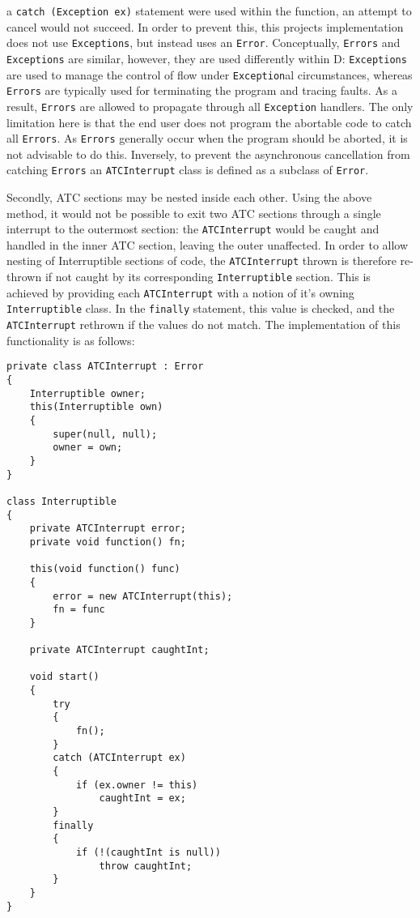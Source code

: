 a \texttt{catch (Exception ex)} statement were used within the function, an
attempt to cancel would not succeed. 
In order to prevent this, this projects implementation does not use 
\texttt{Exceptions}, but instead uses an \texttt{Error}. 
Conceptually, \texttt{Errors} and \texttt{Exceptions} are
similar, however, they are used differently within D: \texttt{Exceptions} are used to
manage the control of flow under \texttt{Exception}al circumstances, whereas
\texttt{Errors} are typically used for terminating the program and tracing faults. 
As a result, \texttt{Errors} are allowed to propagate through all 
\texttt{Exception} handlers. The only
limitation here is that the end user does not program the
abortable code to catch all \texttt{Errors}. As \texttt{Errors} generally occur 
when the program should be aborted, it is not advisable to do this. 
Inversely, to prevent the asynchronous cancellation from catching
\texttt{Errors} an \texttt{ATCInterrupt} class is defined as a subclass of
\texttt{Error}. 
\par\bigskip\noindent
Secondly, ATC sections may be nested inside each other. Using the above 
method, it would not be possible to exit two ATC sections through a single interrupt
to the outermost section: the \texttt{ATCInterrupt} would be caught and
handled in the inner ATC section, leaving the outer unaffected.
In order to allow nesting of Interruptible sections of code, the
\texttt{ATCInterrupt} thrown is therefore re-thrown if not caught by its 
corresponding \texttt{Interruptible} section. 
This is achieved by providing each \texttt{ATCInterrupt} with a notion of it's
owning \texttt{Interruptible} class. In the \texttt{finally} statement, this
value is checked, and the \texttt{ATCInterrupt} rethrown if the values do not
match. The implementation of this functionality is as follows: 
\begin{lstlisting}[basicstyle=\small]
private class ATCInterrupt : Error
{
    Interruptible owner;
    this(Interruptible own)
    {
        super(null, null);
        owner = own;
    }
}

class Interruptible
{
    private ATCInterrupt error; 
    private void function() fn; 

    this(void function() func)
    {
        error = new ATCInterrupt(this); 
        fn = func
    }

    private ATCInterrupt caughtInt;

    void start()
    {
        try
        {
            fn();
        }
        catch (ATCInterrupt ex)
        {
            if (ex.owner != this)
                caughtInt = ex;
        }
        finally
        {
            if (!(caughtInt is null))
                throw caughtInt;
        }
    }
}
\end{lstlisting}
